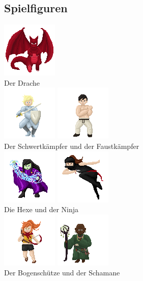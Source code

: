 \documentclass[10pt,a4paper,notitlepage]{report}
\begin{document}
\begin{flushleft}
\section{Spielfiguren}
\begin{center}
	\includegraphics[scale=3]{Dragon.png}\\
	Der Drache\\
		
	\includegraphics[scale=2]{Knight.png}
	\includegraphics[scale=2]{Fighter.png}\\
	Der Schwertkämpfer und der Faustkämpfer\\
	
	\includegraphics[scale=2]{Witch}
	\includegraphics[scale=2]{Ninja}\\
	Die Hexe und der Ninja\\
	
	\includegraphics[scale=2]{Archer}
	\includegraphics[scale=2]{Shaman}\\
	Der Bogenschütze und der Schamane\\


\end{center}
\end{flushleft}
\end{document}
